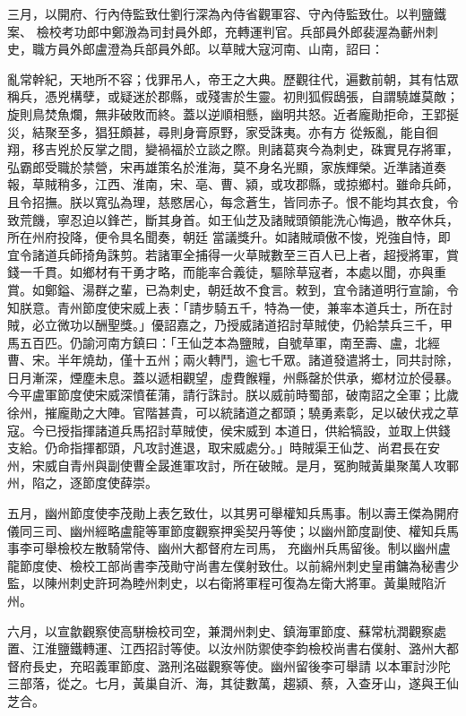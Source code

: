 \begin{pinyinscope}
 三月，以開府、行內侍監致仕劉行深為內侍省觀軍容、守內侍監致仕。以判鹽鐵案、
 檢校考功郎中鄭溵為司封員外郎，充轉運判官。兵部員外郎裴渥為蘄州刺史，職方員外郎盧澄為兵部員外郎。以草賊大寇河南、山南，詔曰：



 亂常幹紀，天地所不容；伐罪吊人，帝王之大典。歷觀往代，遍數前朝，其有怙眾稱兵，憑兇構孽，或疑迷於郡縣，或殘害於生靈。初則狐假鴟張，自謂驍雄莫敵；旋則鳥焚魚爛，無非破敗而終。蓋以逆順相懸，幽明共怒。近者龐勛拒命，王郢挻災，結聚至多，猖狂頗甚，尋則身膏原野，家受誅夷。亦有方
 從叛亂，能自徊翔，移吉兇於反掌之間，變禍福於立談之際。則諸葛爽今為刺史，硃實見存將軍，弘霸郎受職於禁營，宋再雄策名於淮海，莫不身名光顯，家族輝榮。近準諸道奏報，草賊稍多，江西、淮南，宋、亳、曹、潁，或攻郡縣，或掠鄉村。雖命兵師，且令招撫。朕以寬弘為理，慈愍居心，每念蒼生，皆同赤子。恨不能均其衣食，令致荒饑，寧忍迫以鋒芒，斷其身首。如王仙芝及諸賊頭領能洗心悔過，散卒休兵，所在州府投降，便令具名聞奏，朝廷
 當議獎升。如諸賊頑傲不悛，兇強自恃，即宜令諸道兵師掎角誅剪。若諸軍全捕得一火草賊數至三百人已上者，超授將軍，賞錢一千貫。如鄉材有干勇才略，而能率合義徒，驅除草寇者，本處以聞，亦與重賞。如鄭鎰、湯群之輩，已為刺史，朝廷故不食言。敕到，宜令諸道明行宣諭，令知朕意。青州節度使宋威上表：「請步騎五千，特為一使，兼率本道兵士，所在討賊，必立微功以酬聖獎。」優詔嘉之，乃授威諸道招討草賊使，仍給禁兵三千，甲
 馬五百匹。仍諭河南方鎮曰：「王仙芝本為鹽賊，自號草軍，南至壽、盧，北經曹、宋。半年燒劫，僅十五州；兩火轉鬥，逾七千眾。諸道發遣將士，同共討除，日月漸深，煙塵未息。蓋以遞相觀望，虛費餱糧，州縣罄於供承，鄉材泣於侵暴。今平盧軍節度使宋威深憤萑蒲，請行誅討。朕以威前時蜀部，破南詔之全軍；比歲徐州，摧龐勛之大陣。官階甚貴，可以統諸道之都頭；驍勇素彰，足以破伏戎之草寇。今已授指揮諸道兵馬招討草賊使，侯宋威到
 本道日，供給犒設，並取上供錢支給。仍命指揮都頭，凡攻討進退，取宋威處分。」時賊渠王仙芝、尚君長在安州，宋威自青州與副使曹全晸進軍攻討，所在破賊。是月，冤朐賊黃巢聚萬人攻鄆州，陷之，逐節度使薛崇。



 五月，幽州節度使李茂勛上表乞致仕，以其男可舉權知兵馬事。制以壽王傑為開府儀同三司、幽州經略盧龍等軍節度觀察押奚契丹等使；以幽州節度副使、權知兵馬事李可舉檢校左散騎常侍、幽州大都督府左司馬，
 充幽州兵馬留後。制以幽州盧龍節度使、檢校工部尚書李茂勛守尚書左僕射致仕。以前綿州刺史皇甫鏞為秘書少監，以陳州刺史許珂為睦州刺史，以右衛將軍程可復為左衛大將軍。黃巢賊陷沂州。



 六月，以宣歙觀察使高駢檢校司空，兼潤州刺史、鎮海軍節度、蘇常杭潤觀察處置、江淮鹽鐵轉運、江西招討等使。以汝州防禦使李鈞檢校尚書右僕射、潞州大都督府長史，充昭義軍節度、潞刑洺磁觀察等使。幽州留後李可舉請
 以本軍討沙陀三部落，從之。七月，黃巢自沂、海，其徒數萬，趨潁、蔡，入查牙山，遂與王仙芝合。




\end{pinyinscope}
